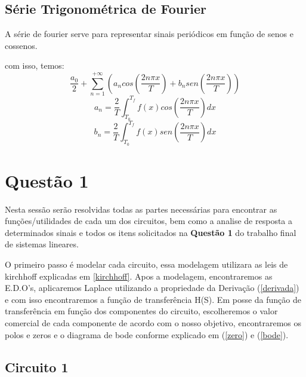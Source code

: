 \documentclass[a4paper, 12pt]{article}
\begin{document}
		\subsection{Série Trigonométrica de Fourier}
		A série de fourier serve para representar sinais periódicos em função de senos e cossenos.
		
		com isso, temos:
		\[\frac{a_{0}}{2} + \sum_{n=1}^{+\infty}(a_{n}cos(\frac{2n\pi x}{T}) + b_{n}sen(\frac{2n\pi x}{T}))\]
		\[a_{n} = \frac{2}{T}\int_{T_{0}}^{T_{f}}f(x)cos(\frac{2n\pi x}{T})dx\]		
		\[b_{n} = \frac{2}{T}\int_{T_{0}}^{T_{f}}f(x)sen(\frac{2n\pi x}{T})dx\]				
	\newpage
	\section{Quest\~{a}o 1}\label{q1}
		Nesta sessão serão resolvidas todas as partes necessárias para encontrar as funções/utilidades de cada um dos circuitos, bem como a analise de resposta a determinados sinais e todos os itens solicitados na \textbf{Questão 1} do trabalho final de sistemas lineares.

		O primeiro passo é modelar cada circuito, essa modelagem utilizara as leis de kirchhoff explicadas em \ref{kirchhoff}. Apos a modelagem, encontraremos as E.D.O's, aplicaremos Laplace utilizando a propriedade da Derivação (\ref{derivada}) e com isso encontraremos a função de transferência H(S). Em posse da função de transferência em função dos componentes do circuito, escolheremos o valor comercial de cada componente de acordo com o nosso objetivo, encontraremos os polos e zeros e o diagrama de bode conforme explicado em (\ref{zero}) e (\ref{bode}).

		\subsection{Circuito 1}
\end{document}
